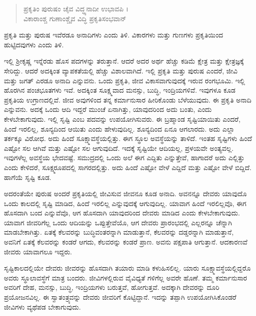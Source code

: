 \begin{verse}
ಪ್ರಕೃತಿಂ ಪುರುಷಂ ಚೈವ ವಿದ್ಧ್ಯನಾದೀ ಉಭಾವಪಿ ।\\ವಿಕಾರಾಂಶ್ಚ ಗುಣಾಂಶ್ಚೈವ ವಿದ್ಧಿ ಪ್ರಕೃತಿಸಂಭವಾನ್ 
\end{verse}

{\small ಪ್ರಕೃತಿ ಮತ್ತು ಪುರುಷ ಇವೆರಡೂ ಅನಾದಿಗಳು ಎಂದು ತಿಳಿ. ವಿಕಾರಗಳು ಮತ್ತು ಗುಣಗಳು ಪ್ರಕೃತಿಯಿಂದ ಹುಟ್ಟಿದವುಗಳು ಎಂದು ತಿಳಿ.}

ಇಲ್ಲಿ ಶ್ರೀಕೃಷ್ಣ ಇನ್ನೆರಡು ಹೊಸ ಪದಗಳನ್ನು ತರುತ್ತಾನೆ. ಆದರೆ ಅದರ ಅರ್ಥ ಹೆಚ್ಚು ಕಡಿಮೆ ಕ್ಷೇತ್ರ ಮತ್ತು ಕ್ಷೇತ್ರಜ್ಞಕ್ಕೆ ಸೇರಿದ್ದು. ಆದರೆ ಅದಕ್ಕಿಂತ ವ್ಯಾಪಕತೆಯಲ್ಲಿ ಹೆಚ್ಚು ವಿಶಾಲವಾಗಿದೆ. ಇಲ್ಲಿ ಪ್ರಕೃತಿ ಮತ್ತು ಪುರುಷ ಎಂದರೆ, ಜೀವಿ ಮತ್ತು ಜಗತ್ ಎರಡೂ ಅನಾದಿ ಎನ್ನುವನು. ಒಂದು ಪ್ರಕೃತಿ, ಜೀವ ವಿಕಾಸವಾಗುವುದಕ್ಕೆ ಇರುವ ರಂಗಭೂಮಿ. ಇಲ್ಲಿ ಹೊರಗಿನ ಪಂಚಭೂತಗಳು ಇವೆ. ಅದಕ್ಕಿಂತ ಸೂಕ್ಷ್ಮವಾದ ಮನಸ್ಸು, ಬುದ್ಧಿ, ಇಂದ್ರಿಯಗಳಿವೆ. ಇವುಗಳೂ ಕೂಡ ಪ್ರಕೃತಿಯ ಉಗ್ರಾಣದಲ್ಲಿವೆ. ಜೀವ ಅವುಗಳಿಂದ ತನ್ನ ಕರ್ಮಾನುಸಾರ ಹೀರಿಕೊಂಡು ಬೆಳೆಯುವುದು. ಈ ಪ್ರಕೃತಿ ಅನಾದಿ ಎನ್ನುವನು. ಅದಕ್ಕೆ ಒಂದು ಆದಿ ಇದ್ದರೆ ಮುಂಚೆ ಏನಾಗಿತ್ತು, ಯಾವುದರಿಂದ ಅದು ಬಂತು, ಎಂದು ಕೇಳಬೇಕಾಗುವುದು. ಇಲ್ಲಿ ಸೃಷ್ಟಿ ಎಂಬ ಪದವನ್ನು ಉಪಯೋಗಿಸುವರು. ಈ ಬ್ರಹ್ಮಾಂಡ ಸೃಷ್ಟಿಯಾಯಿತು ಎಂದರೆ, ಹಿಂದೆ ಇರಲಿಲ್ಲ, ಶೂನ್ಯದಿಂದ ಆಯಿತು ಎಂದು ಹೇಳುವುದಿಲ್ಲ. ಶೂನ್ಯದಿಂದ ಏನೂ ಆಗಲಾರದು. ಅದು ಎಲ್ಲಾ ತರ್ಕಕ್ಕೂ ವಿರೋಧ. ಅದು ಹಿಂದೆ ಸೂಕ್ಷ್ಮಾವಸ್ಥೆಯಲ್ಲಿತ್ತು. ಈಗ ಸ್ಥೂಲ ಅವಸ್ಥೆಯನ್ನು ತಾಳಿದೆ. ಇಂತಹ ಸೃಷ್ಟಿಗಳು ಹಿಂದೆ ಎಷ್ಟೋ ಸಲ ಆಗಿವೆ ಮತ್ತು ಎಷ್ಟೋ ಸಲ ಆಗುವುದಿದೆ. ಇದಕ್ಕೆ ಸೃಷ್ಟಿಯೇ ಆದಿಯಲ್ಲ, ಪ್ರಳಯವೇ ಅಂತ್ಯವಲ್ಲ. ಇವುಗಳೆಲ್ಲ ಅವಸ್ಥೆಯ ಭೇದವಷ್ಟೆ. ಸಮುದ್ರದಲ್ಲಿ ಒಂದು ಅಲೆ ಈಗ ಎದ್ದಿತು ಎನ್ನುತ್ತೇವೆ, ಹಾಗಾದರೆ ಅದು ಎಲ್ಲಿತ್ತು ಎಂದು ಕೇಳಿದರೆ, ಸೂಕ್ಷ್ಮರೂಪದಲ್ಲಿ ಸಾಗರದಲ್ಲಿತ್ತು. ಅದು ಹಿಂದೆ ಎಷ್ಟೋ ವೇಳೆ ಎದ್ದಿದೆ ಮತ್ತು ಎಷ್ಟೋ ವೇಳೆ ಬಿದ್ದಿದೆ. ಹಾಗೆಯೆ ಸೃಷ್ಟಿ ಕೂಡ.

ಅದರಂತೆಯೇ ಪುರುಷ ಅಂದರೆ ಪ್ರಕೃತಿಯಲ್ಲಿ ಜೀವಿಸುವ ಜೀವನೂ ಕೂಡ ಅನಾದಿ. ಅವನನ್ನೂ ದೇವರು ಯಾವುದೊ ಒಂದು ಕಾಲದಲ್ಲಿ ಸೃಷ್ಟಿ ಮಾಡಿದ, ಹಿಂದೆ ಇರಲಿಲ್ಲ ಎನ್ನುವುದಕ್ಕೆ ಆಗುವುದಿಲ್ಲ. ಯಾವಾಗ ಹಿಂದೆ ಇರಲಿಲ್ಲವೊ, ಈಗ ಹೊಸದಾಗಿ ಬಂದ ಎನ್ನುವೆವೊ, ಆಗ ಹೊಸದಾಗಿ ಯಾವುದರಿಂದ ದೇವರು ಮಾಡಿದ ಎಂದು ಕೇಳಬೇಕಾಗುವುದು. ಯಾವಾಗ ಜೀವರಿಗೆಲ್ಲ ಒಂದು ಆದಿಯನ್ನು ಒಪ್ಪುತ್ತೇವೆಯೊ, ಆಗ ದೇವರು ಪ್ರಾರಂಭದಲ್ಲಿ ಎಲ್ಲರನ್ನೂ ಚೆನ್ನಾಗಿ ಮಾಡಬೇಕಾಗಿತ್ತು. ಏತಕ್ಕೆ ಕೆಲವರನ್ನು ಬುದ್ಧಿವಂತರನ್ನಾಗಿ ಮಾಡುತ್ತಾನೆ, ಕೆಲವರನ್ನು ದಡ್ಡರನ್ನಾಗಿ ಮಾಡುತ್ತಾನೆ, ಅವನಿಗೆ ಏತಕ್ಕೆ ಕೆಲವರನ್ನು ಕಂಡರೆ ಆಗದು, ಕೆಲವರನ್ನು ಕಂಡರೆ ಪ್ರಾಣ. ಅವನು ಪಕ್ಷಪಾತಿ ಆಗುತ್ತಾನೆ. ಆದಕಾರಣವೆ ಜೀವರು ಯಾವಾಗಲೂ ಇದ್ದರು.

ಸೃಷ್ಟಿಕಾಲದಲ್ಲಿಯೇ ದೇವರು ಜೀವರನ್ನು ಹೊಸದಾಗಿ ತಯಾರು ಮಾಡಿ ಕಳುಹಿಸಲಿಲ್ಲ. ಯಾರು ಸೂಕ್ಷ್ಮಾವಸ್ಥೆಯಲ್ಲಿದ್ದರೊ ಅವರು ಸ್ಥೂಲಾವಸ್ಥೆಗೆ ಮಾತ್ರ ಬಂದರು. ಜೀವಿಗಳಲ್ಲಿರುವ ವೈವಿಧ್ಯತೆ ಗಳಿಗೆಲ್ಲ ಅವರೇ ಹೊಣೆ. ತಮ್ಮ ಕರ್ಮಾನುಸಾರ ಅವರಿಗೆ ದೇಹ, ಮನಸ್ಸು, ಬುದ್ಧಿ, ಇಂದ್ರಿಯಗಳು ಬರುತ್ತವೆ, ಹೋಗುತ್ತವೆ. ಅದಕ್ಕಾಗಿ ದೇವರನ್ನು ದೂರಿ ಪ್ರಯೋಜನವಿಲ್ಲ. ಈ ಸ್ವಾತಂತ್ರ್ಯವನ್ನು ದೇವರು ಜೀವರಿಗೆ ಕೊಟ್ಟಿದ್ದಾನೆ. ಇದನ್ನು ತಪ್ಪಾಗಿ ಉಪಯೋಗಿಸಿಕೊಂಡರೆ ಜೀವಿಗಳು ವ್ಯಥೆಪಡ ಬೇಕಾಗುವುದು.

